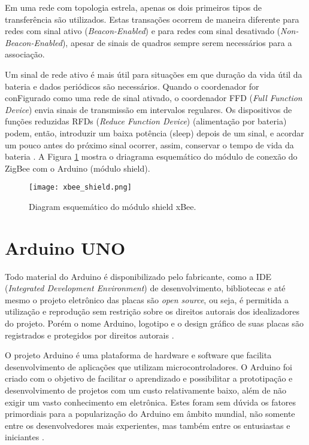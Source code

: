 \documentclass[12pt,report,cor2018]{uftpibic}
\begin{document}
Em uma rede com topologia estrela, apenas os dois primeiros tipos de transferência são utilizados. Estas transações ocorrem de maneira diferente para redes com sinal ativo ({\it Beacon-Enabled}) e para redes com sinal desativado ({\it Non-Beacon-Enabled}), apesar de sinais de quadros sempre serem necessários para a associação.

Um sinal de rede ativo é mais útil para situações em que duração da vida útil da bateria e dados periódicos são necessários. Quando o coordenador for conFigurado como uma rede de sinal ativado, o coordenador FFD ({\it Full Function Device}) envia sinais de transmissão em intervalos regulares. Os dispositivos de funções reduzidas RFDs ({\it Reduce Function Device}) (alimentação por bateria) podem, então, introduzir um baixa potência (sleep) depois de um sinal, e acordar um pouco antes do próximo sinal ocorrer, assim, conservar o tempo de vida da bateria \cite{marcos}. A Figura \ref{fig:xbee} mostra o driagrama esquemático do módulo de conexão do ZigBee com o Arduino (módulo shield).

\begin{figure}[!h]
\centering
\texttt{[image: xbee\_shield.png]}
\caption{Diagram esquemático do módulo shield xBee.}
\label{fig:xbee}
\end{figure}

\section{Arduino UNO}

Todo material do Arduino é disponibilizado pelo fabricante, como a IDE ({\it Integrated Development Environment}) de desenvolvimento, bibliotecas e até mesmo o projeto eletrônico das placas são {\it open source}, ou seja, é permitida a utilização e reprodução sem restrição sobre os direitos autorais dos idealizadores do projeto. Porém o nome Arduino, logotipo e o design gráfico de suas placas são registrados e protegidos por direitos autorais \cite{marcos}.

O projeto Arduino é uma plataforma de hardware e software que facilita desenvolvimento de aplicações que utilizam microcontroladores. O Arduino foi criado com o objetivo de facilitar o aprendizado e possibilitar a prototipação e desenvolvimento de projetos com um custo relativamente baixo, além de não exigir um vasto conhecimento em eletrônica. Estes foram sem dúvida os fatores primordiais para a popularização do Arduino em âmbito mundial, não somente entre os desenvolvedores mais experientes, mas também entre os entusiastas e iniciantes \cite{marcos}.
\end{document}
